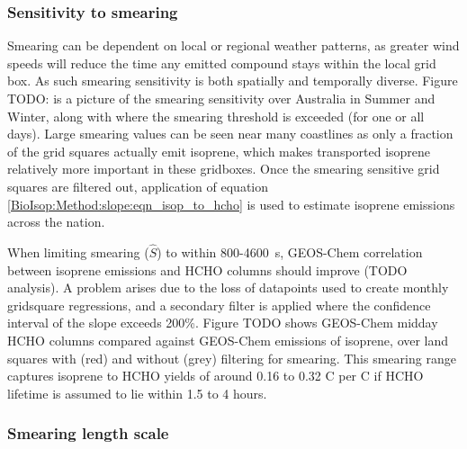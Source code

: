       

    \subsubsection{Sensitivity to smearing}
    
      Smearing can be dependent on local or regional weather patterns, as greater wind speeds will reduce the time any emitted compound stays within the local grid box.
      As such smearing sensitivity is both spatially and temporally diverse.
      Figure TODO: is a picture of the smearing sensitivity over Australia in Summer and Winter, along with where the smearing threshold is exceeded (for one or all days).
      Large smearing values can be seen near many coastlines as only a fraction of the grid squares actually emit isoprene, which makes transported isoprene relatively more important in these gridboxes.
      Once the smearing sensitive grid squares are filtered out, application of equation \ref{BioIsop:Method:slope:eqn_isop_to_hcho} is used to estimate isoprene emissions across the nation.
      
      
      
      When limiting smearing ($\hat{S}$) to within 800-4600~s, GEOS-Chem correlation between isoprene emissions and HCHO columns should improve (TODO analysis). 
      A problem arises due to the loss of datapoints used to create monthly gridsquare regressions, and a secondary filter is applied where the confidence interval of the slope exceeds 200\%.
      Figure TODO shows GEOS-Chem midday HCHO columns compared against GEOS-Chem emissions of isoprene, over land squares with (red) and without (grey) filtering for smearing.
      This smearing range captures isoprene to HCHO yields of around 0.16 to 0.32 C per C if HCHO lifetime is assumed to lie within 1.5 to 4 hours.
    
    \subsubsection{Smearing length scale}
    
